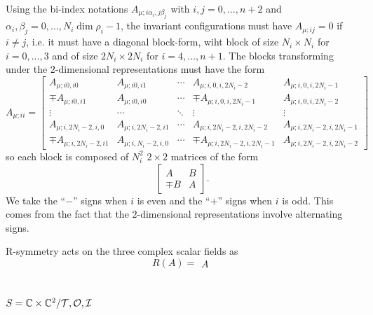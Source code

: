         Using the bi-index notations $A_{\mu;i\alpha_i,j\beta_j}$ with $i,j=0,\dots,n+2$ and $\alpha_i,\beta_j=0,\dots,N_i\dim\rho_i-1$, the invariant configurations must have $A_{\mu;ij}=0$ if $i\neq j$, i.e. it must have a diagonal block-form, wiht block of size $N_i\times N_i$ for $i=0,\dots,3$ and of size $2N_i\times 2N_i$ for $i=4,\dots,n+1$. The blocks transforming under the $2$-dimensional representations must have the form
        \begin{equation}
            A_{\mu;ii}=
            \begin{bmatrix}
                A_{\mu;i0,i0} & A_{\mu;i0,i1} & \cdots & A_{\mu;i,0,i,2N_i-2} & A_{\mu;i,0,i,2N_i-1} \\ 
                \mp A_{\mu;i0,i1} & A_{\mu;i0,i0} & \cdots & \mp A_{\mu;i,0,i,2N_i-1} & A_{\mu;i,0,i,2N_i-2} \\
                \vdots & \cdots & \ddots & \vdots & \vdots \\
                A_{\mu;i,2N_i-2,i,0} & A_{\mu;i,2N_i-2,i1} & \cdots & A_{\mu;i,2N_i-2,i,2N_i-2} & A_{\mu;i,2N_i-2,i,2N_i-1} \\ 
                \mp A_{\mu;i,2N_i-2,i1} & A_{\mu;i,N_i-2,i,0} & \cdots & \mp  A_{\mu;i,2N_i-2,i,2N_i-1} & A_{\mu;i,2N_i-2,i,2N_i-2}
            \end{bmatrix}
        \end{equation}
        so each block is composed of $N^2_i$ $2\times2$ matrices of the form
        \begin{equation}
            \begin{bmatrix}
                A & B \\
                \mp B & A
            \end{bmatrix}.
        \end{equation}
        We take the ``$-$'' signs when $i$ is even and the ``$+$'' signs when $i$ is odd. This comes from the fact that the $2$-dimensional representations involve alternating signs.

        R-symmetry acts on the three complex scalar fields as
        \begin{equation}
            R(A) =
            \begin{matrix}
                A
            \end{matrix}
        \end{equation}

        \marker

    \subsection{$S=\mathbb{C}\times\mathbb{C}^2/\mathcal{T},\mathcal{O},\mathcal{I}$}


